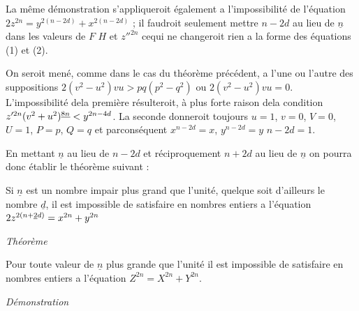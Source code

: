 \documentclass[11pt,a4paper]{article}
\begin{document}
La même démonstration s'appliqueroit également a l'impossibilité
de l'équation $2z^{2n}=y^{2(n-2d)}+x^{2(n-2d)}$ ; il faudroit seulement
mettre $n-2d$ au lieu de $\underline{n}$ dans les valeurs de $F$ $H$ et $z''^{2n}$ cequi
ne changeroit rien a la forme des équations (1) et (2).

On seroit mené, comme dans le cas du théorème précédent,
a l'une ou l'autre des suppositions $2(v^2-u^2)vu>pq(p^2-q^2)$
ou $2(v^2-u^2)vu=0$. L'impossibilité dela première résulteroit,
à plus forte raison dela condition $z'^{2n}(v^2+u^2)^{\uncertain{8n}}<y^{2n-4d}$.
La seconde donneroit toujours $u=1$, $v=0$, $V=0$, $U=1$, $P=p$, $Q=q$
et parconséquent $x^{n-2d}=x$, $y^{n-2d}=y$ \quad $n-2d=1$.

En mettant $\underline{n}$ au lieu de $n-2d$ et réciproquement $n+2d$ au lieu
de $\underline{n}$ on pourra donc établir le théorème suivant :

Si $\underline{n}$ est un nombre impair plus grand que l'unité, quelque
soit d'ailleurs le nombre $\underline{d}$, il est impossible de satisfaire
en nombres entiers a l'équation $2z^{2(n+\uncertain{2}d)}=x^{2n}+y^{2n}$

\emph{Théorème}

Pour toute valeur de $\underline{n}$ plus grande que l'unité il est impossible de
satisfaire en nombres entiers a l'équation $Z^{2n}=X^{2n}+Y^{2n}$.

\emph{Démonstration}
\end{document}

